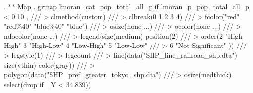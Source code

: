 . ** Map
. grmap lmoran_cat_pop_total_all_p if lmoran_p_pop_total_all_p < 0.10 , ///
>         clmethod(custom) ///
>         clbreak(0 1 2 3 4) ///
>         fcolor("red" "red\%40" "blue\%40" "blue") ///
>         osize(none ...) ///
>         ocolor(none ...) ///
>         ndocolor(none ...) ///
>         legend(size(medium) position(2) ///
>                 order(2 "High-High" 3 "High-Low" 4 "Low-High" 5 "Low-Low" ///
>                 6 "Not Significant" )) ///
>         legstyle(1) ///
>         legcount /// 
>         line(data("SHP_line_railroad_shp.dta") size(vthin) color(gray)) ///
>         polygon(data("SHP_pref_greater_tokyo_shp.dta") ///
>                 osize(medthick) select(drop if _Y < 34.839))
